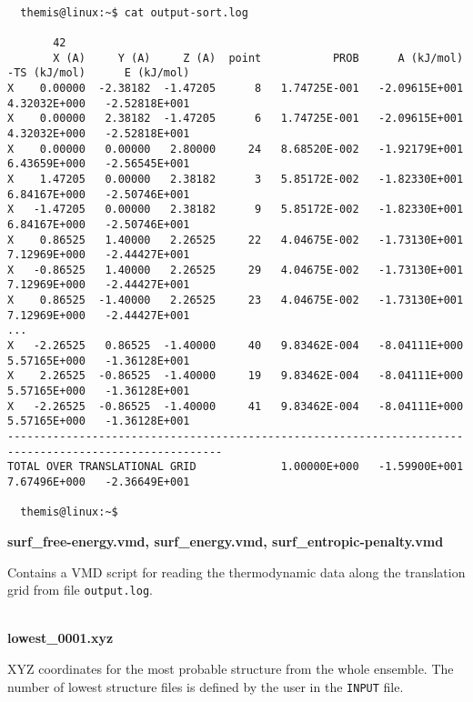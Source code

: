 \documentclass{achemso}
\begin{document}
\begin{center}
  \begin{minipage}{0.95\textwidth}
    \begin{verbatim}

  themis@linux:~$ cat output-sort.log

       42
       X (A)     Y (A)     Z (A)  point           PROB      A (kJ/mol)    -TS (kJ/mol)      E (kJ/mol)
X    0.00000  -2.38182  -1.47205      8   1.74725E-001   -2.09615E+001    4.32032E+000   -2.52818E+001
X    0.00000   2.38182  -1.47205      6   1.74725E-001   -2.09615E+001    4.32032E+000   -2.52818E+001
X    0.00000   0.00000   2.80000     24   8.68520E-002   -1.92179E+001    6.43659E+000   -2.56545E+001
X    1.47205   0.00000   2.38182      3   5.85172E-002   -1.82330E+001    6.84167E+000   -2.50746E+001
X   -1.47205   0.00000   2.38182      9   5.85172E-002   -1.82330E+001    6.84167E+000   -2.50746E+001
X    0.86525   1.40000   2.26525     22   4.04675E-002   -1.73130E+001    7.12969E+000   -2.44427E+001
X   -0.86525   1.40000   2.26525     29   4.04675E-002   -1.73130E+001    7.12969E+000   -2.44427E+001
X    0.86525  -1.40000   2.26525     23   4.04675E-002   -1.73130E+001    7.12969E+000   -2.44427E+001
...
X   -2.26525   0.86525  -1.40000     40   9.83462E-004   -8.04111E+000    5.57165E+000   -1.36128E+001
X    2.26525  -0.86525  -1.40000     19   9.83462E-004   -8.04111E+000    5.57165E+000   -1.36128E+001
X   -2.26525  -0.86525  -1.40000     41   9.83462E-004   -8.04111E+000    5.57165E+000   -1.36128E+001
-------------------------------------------------------------------------------------------------------
TOTAL OVER TRANSLATIONAL GRID             1.00000E+000   -1.59900E+001    7.67496E+000   -2.36649E+001

  themis@linux:~$ 

    \end{verbatim}
    \vskip0.25cm
  \end{minipage}%
\end{center}

\textbf{surf\_free-energy.vmd, surf\_energy.vmd, surf\_entropic-penalty.vmd} 

  Contains a VMD script for reading the thermodynamic data along the translation
  grid from file \texttt{output.log}. \\~

\textbf{lowest\_0001.xyz}
  
  XYZ coordinates for the most probable structure from the whole ensemble. The
  number of lowest structure files is defined by the user in the \texttt{INPUT}
  file. \\~
\end{document}
